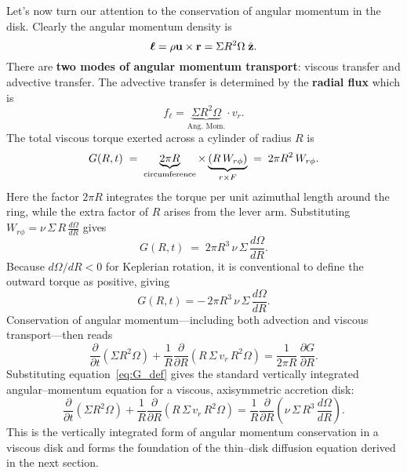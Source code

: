 Let's now turn our attention to the conservation of angular momentum in the disk. Clearly the angular momentum density is
\[
\boldsymbol{\ell} = \rho {\bf u} \times {\bf r} = \Sigma R^2 \Omega \;\hat{\bf z}.
\]
There are \textbf{two modes of angular momentum transport}: viscous transfer and advective transfer. The advective transfer is determined by the \textbf{radial flux} which is
\[
f_\ell = \underbrace{\Sigma R^2 \Omega}_{\text{Ang. Mom.}} \cdot v_r. 
\]
The total viscous torque exerted across a cylinder of radius $R$ is 
\begin{equation}
G(R,t) \;=\; \underbrace{2\pi R}_{\rm circumference} 
\times 
\underbrace{(R\,W_{r\phi})}_{r\times F}
\;=\; 2\pi R^2\,W_{r\phi}.
\end{equation}
Here the factor $2\pi R$ integrates the torque per unit azimuthal length around the ring, while the extra factor of $R$ arises from the lever arm.  
Substituting $W_{r\phi} = \nu\,\Sigma\,R\,\tfrac{d\Omega}{dR}$ gives
\begin{equation}
G(R,t) \;=\; 2\pi R^3\,\nu\,\Sigma\,\frac{d\Omega}{dR}.
\end{equation}
Because $d\Omega/dR < 0$ for Keplerian rotation, it is conventional to define the outward torque as positive, giving
\begin{equation}
\boxed{
G(R,t)
= -\,2\pi R^3\,\nu\,\Sigma\,\frac{d\Omega}{dR}.
}
\label{eq:G_def}
\end{equation}
Conservation of angular momentum—including both advection and viscous transport—then reads
\begin{equation}
\boxed{\;
\frac{\partial}{\partial t}\!\left(\Sigma R^2\Omega\right)
+ \frac{1}{R}\frac{\partial}{\partial R}\!\left(R\,\Sigma\,v_r\,R^2\Omega\right)
= \frac{1}{2\pi R}\,\frac{\partial G}{\partial R}.
\;}
\label{eq:angmom_cons_disk}
\end{equation}
Substituting equation~\eqref{eq:G_def} gives the standard vertically integrated angular–momentum equation for a viscous, axisymmetric accretion disk:
\begin{equation}
\boxed{\;
\frac{\partial}{\partial t}\!\left(\Sigma R^2\Omega\right)
+ \frac{1}{R}\frac{\partial}{\partial R}\!\left(R\,\Sigma\,v_r\,R^2\Omega\right)
= \frac{1}{R}\frac{\partial}{\partial R}
   \!\left(\nu\,\Sigma\,R^3\,\frac{d\Omega}{dR}\right).
\;}
\label{eq:angmom_cons_viscous}
\end{equation}
This is the vertically integrated form of angular momentum conservation in a viscous disk and forms the foundation of the thin–disk diffusion equation derived in the next section.


